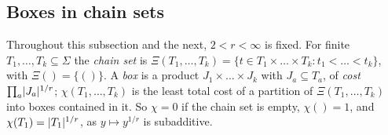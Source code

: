 \subsection{Boxes in chain sets}\label{ord:ssec:boxes}

Throughout this subsection and the next, $2<r<\infty$ is fixed. For finite $T_1,\dots,T_k\subseteq\Sigma$ the
\emph{chain set} is $\Xi(T_1,\dots,T_k)=\{t\in T_1\times\dots\times T_k:t_1<\dots<t_k\}$, with $\Xi()=\{()\}$. A
\emph{box} is a product $J_1\times\dots\times J_k$ with $J_a\subseteq T_a$, of \emph{cost} $\prod_a\lvert J_a\rvert^{1/r}$;
$\chi(T_1,\dots,T_k)$ is the least total cost of a partition of $\Xi(T_1,\dots,T_k)$ into boxes contained in it. So
$\chi=0$ if the chain set is empty, $\chi()=1$, and $\chi(T_1)=\lvert T_1\rvert^{1/r}$, as $y\mapsto y^{1/r}$ is subadditive.

